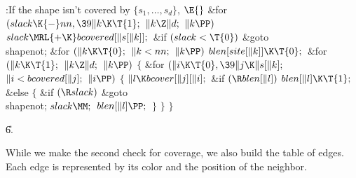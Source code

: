 \B{}:If the shape isn't covered by $\{s_1,\ldots,s_d\}$, \X${}\E{}$\6
\&{for} ${}(\\{slack}\K{-}\\{nn},\39\|k\K\T{1};{}$ ${}\|k\Z\|d;{}$ ${}\|k%
\PP){}$\1\5
${}\\{slack}\MRL{+{\K}}\\{bcovered}[\|s[\|k]];{}$\2\6
\&{if} ${}(\\{slack}<\T{0}){}$\1\5
\&{goto} \\{shapenot};\2\6
\&{for} ${}(\|k\K\T{0};{}$ ${}\|k<\\{nn};{}$ ${}\|k\PP){}$\1\5
${}\\{blen}[\\{site}[\|k]]\K\T{0};{}$\2\6
\&{for} ${}(\|k\K\T{1};{}$ ${}\|k\Z\|d;{}$ ${}\|k\PP){}$\5
${}\{{}$\1\6
\&{for} ${}(\|i\K\T{0},\39\|j\K\|s[\|k];{}$ ${}\|i<\\{bcovered}[\|j];{}$ ${}\|i%
\PP){}$\5
${}\{{}$\1\6
${}\|l\K\\{bcover}[\|j][\|i];{}$\6
\&{if} ${}(\R\\{blen}[\|l]){}$\1\5
${}\\{blen}[\|l]\K\T{1};{}$\2\6
\&{else}\5
${}\{{}$\1\6
\&{if} ${}(\R\\{slack}){}$\1\5
\&{goto} \\{shapenot};\2\6
${}\\{slack}\MM;{}$\6
${}\\{blen}[\|l]\PP;{}$\6
\4${}\}{}$\2\6
\4${}\}{}$\2\6
\4${}\}{}$\2\par
\U6.\fi

While we make the second check for coverage, we also build the table of
edges.
Each edge is represented by its color and the position of the neighbor.

